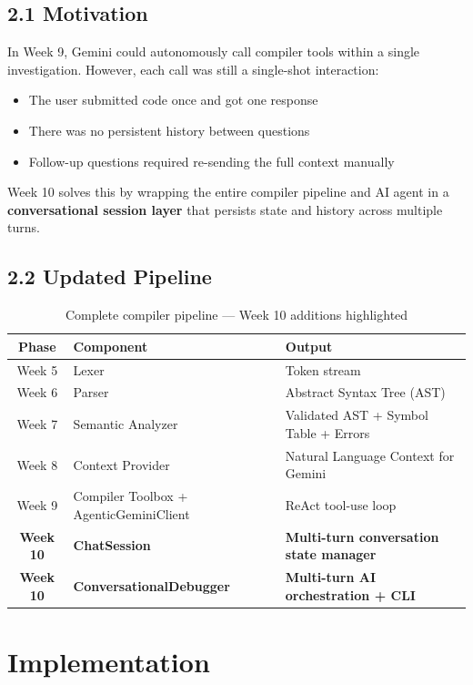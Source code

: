 \documentclass[a4paper,11pt]{article}
\begin{document}
\subsection{2.1 Motivation}

In Week 9, Gemini could autonomously call compiler tools within a single investigation. However, each call was still a single-shot interaction:
\begin{itemize}
    \item The user submitted code once and got one response
    \item There was no persistent history between questions
    \item Follow-up questions required re-sending the full context manually
\end{itemize}

Week 10 solves this by wrapping the entire compiler pipeline and AI agent in a \textbf{conversational session layer} that persists state and history across multiple turns.

\subsection{2.2 Updated Pipeline}

\begin{table}[h]
\centering
\begin{tabularx}{\textwidth}{|c|l|X|}
\hline
\rowcolor{blue!10}
\textbf{Phase} & \textbf{Component} & \textbf{Output} \\
\hline
Week 5 & Lexer & Token stream \\
\hline
Week 6 & Parser & Abstract Syntax Tree (AST) \\
\hline
Week 7 & Semantic Analyzer & Validated AST + Symbol Table + Errors \\
\hline
Week 8 & Context Provider & Natural Language Context for Gemini \\
\hline
Week 9 & Compiler Toolbox + AgenticGeminiClient & ReAct tool-use loop \\
\hline
\textbf{Week 10} & \textbf{ChatSession} & \textbf{Multi-turn conversation state manager} \\
\hline
\textbf{Week 10} & \textbf{ConversationalDebugger} & \textbf{Multi-turn AI orchestration + CLI} \\
\hline
\end{tabularx}
\caption{Complete compiler pipeline --- Week 10 additions highlighted}
\end{table}

\section{Implementation}
\end{document}
